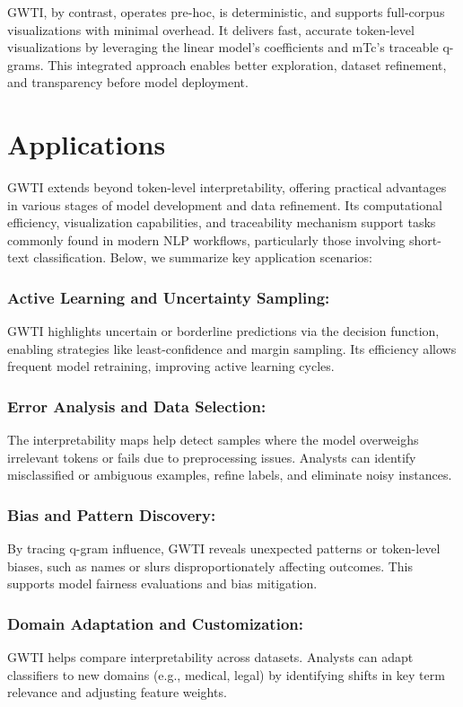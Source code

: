 \documentclass[runningheads,10pt]{llncs}
\begin{document}
\ac{GWTI}, by contrast, operates pre-hoc, is deterministic, and supports full-corpus visualizations with minimal overhead. It delivers fast, accurate token-level visualizations by leveraging the linear model's coefficients and \ac{mTc}’s traceable q-grams. This integrated approach enables better exploration, dataset refinement, and transparency before model deployment.

\section{Applications}
\ac{GWTI} extends beyond token-level interpretability, offering practical advantages in various stages of model development and data refinement. Its computational efficiency, visualization capabilities, and traceability mechanism support tasks commonly found in modern NLP workflows, particularly those involving short-text classification. Below, we summarize key application scenarios:

\subsubsection*{Active Learning and Uncertainty Sampling:} \ac{GWTI} highlights uncertain or borderline predictions via the decision function, enabling strategies like least-confidence and margin sampling. Its efficiency allows frequent model retraining, improving active learning cycles.

\subsubsection*{Error Analysis and Data Selection:} The interpretability maps help detect samples where the model overweighs irrelevant tokens or fails due to preprocessing issues. Analysts can identify misclassified or ambiguous examples, refine labels, and eliminate noisy instances.

\subsubsection*{Bias and Pattern Discovery:} By tracing q-gram influence, \ac{GWTI} reveals unexpected patterns or token-level biases, such as names or slurs disproportionately affecting outcomes. This supports model fairness evaluations and bias mitigation.

\subsubsection*{Domain Adaptation and Customization:} \ac{GWTI} helps compare interpretability across datasets. Analysts can adapt classifiers to new domains (e.g., medical, legal) by identifying shifts in key term relevance and adjusting feature weights.
\end{document}
